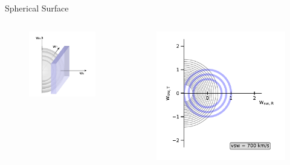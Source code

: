 \documentclass{beamer}
\begin{document}
\begin{frame}{Spherical Surface}
\begin{columns}
	\column{5.5cm}
	\begin{figure}
		\includegraphics[scale=.8]{Pics/slice_R2.pdf}
	\end{figure}

	\column{7.5cm}
\begin{figure}
	\includegraphics[scale=.65]{Pics/cov.pdf}
\end{figure}
\end{columns}
\end{frame}
\end{document}
